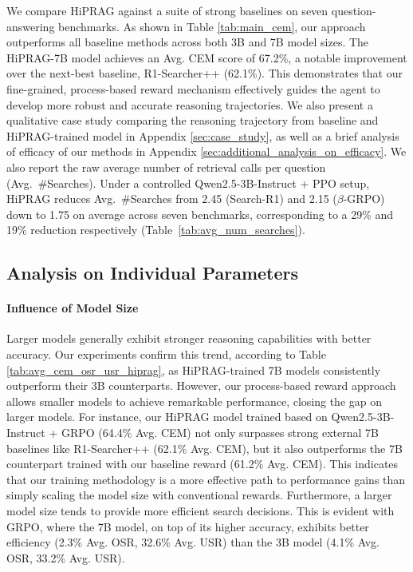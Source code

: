 \documentclass{article}
\begin{document}
We compare HiPRAG against a suite of strong baselines on seven question-answering benchmarks. As shown in Table \ref{tab:main_cem}, our approach outperforms all baseline methods across both 3B and 7B model sizes. The HiPRAG-7B model achieves an Avg. CEM score of 67.2\%, a notable improvement over the next-best baseline, R1-Searcher++ (62.1\%). This demonstrates that our fine-grained, process-based reward mechanism effectively guides the agent to develop more robust and accurate reasoning trajectories. We also present a qualitative case study comparing the reasoning trajectory from baseline and HiPRAG-trained model in Appendix \ref{sec:case_study}, as well as a brief analysis of efficacy of our methods in Appendix \ref{sec:additional_analysis_on_efficacy}. We also report the raw average number of retrieval calls per question (Avg.~\#Searches). Under a controlled Qwen2.5-3B-Instruct + PPO setup, HiPRAG reduces Avg.~\#Searches from 2.45 (Search-R1) and 2.15 ($\beta$-GRPO) down to 1.75 on average across seven benchmarks, corresponding to a 29\% and 19\% reduction respectively (Table~\ref{tab:avg_num_searches}).

\subsection{Analysis on Individual Parameters}
\label{ssec:analysis_on_individual_parameters}


\paragraph{Influence of Model Size}
Larger models generally exhibit stronger reasoning capabilities with better accuracy. Our experiments confirm this trend, according to Table \ref{tab:avg_cem_osr_usr_hiprag}, as HiPRAG-trained 7B models consistently outperform their 3B counterparts. However, our process-based reward approach allows smaller models to achieve remarkable performance, closing the gap on larger models. For instance, our HiPRAG model trained based on Qwen2.5-3B-Instruct + GRPO (64.4\% Avg. CEM) not only surpasses strong external 7B baselines like R1-Searcher++ (62.1\% Avg. CEM), but it also outperforms the 7B counterpart trained with our baseline reward (61.2\% Avg. CEM). This indicates that our training methodology is a more effective path to performance gains than simply scaling the model size with conventional rewards. Furthermore, a larger model size tends to provide more efficient search decisions. This is evident with GRPO, where the 7B model, on top of its higher accuracy, exhibits better efficiency (2.3\% Avg. OSR, 32.6\% Avg. USR) than the 3B model (4.1\% Avg. OSR, 33.2\% Avg. USR).
\end{document}
